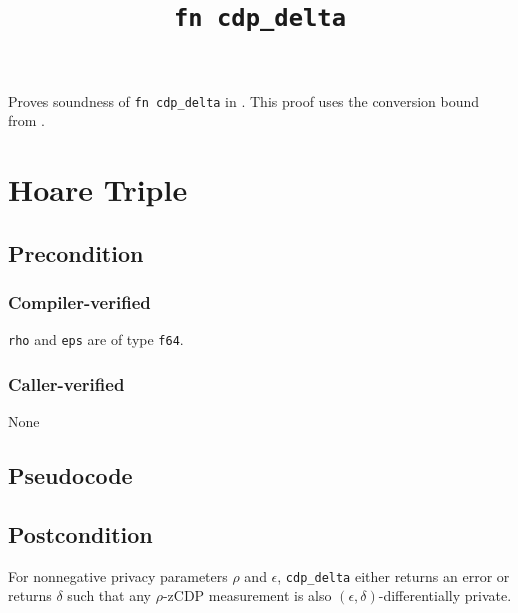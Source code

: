 \documentclass{article}
\title{\texttt{fn cdp\_delta}}
\author{\MichaelShoemateAuthor}
\begin{document}
\maketitle
\contrib

Proves soundness of \texttt{fn cdp\_delta} in .
This proof uses the conversion bound from \cite[Proposition~7 and Equation~(2), NeurIPS 2020 version]{CKS20}.

\section{Hoare Triple}
\subsection*{Precondition}
\subsubsection*{Compiler-verified}
\texttt{rho} and \texttt{eps} are of type \texttt{f64}.

\subsubsection*{Caller-verified}
None

\subsection*{Pseudocode}


\subsection*{Postcondition}
\begin{theorem}
    For nonnegative privacy parameters $\rho$ and $\epsilon$,
    \texttt{cdp\_delta} either returns an error or returns $\delta$ such that
    any $\rho$-zCDP measurement is also $(\epsilon,\delta)$-differentially private.
\end{theorem}
\end{document}

